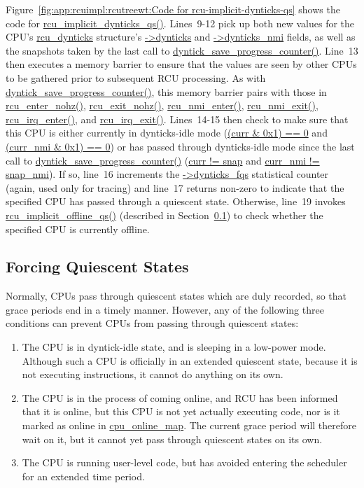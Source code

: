 Figure~\ref{fig:app:rcuimpl:rcutreewt:Code for rcu-implicit-dynticks-qs}
shows the code for \url{rcu_implicit_dynticks_qs()}.
Lines~9-12 pick up both new values for the CPU's \url{rcu_dynticks}
structure's \url{->dynticks} and \url{->dynticks_nmi} fields, as well
as the snapshots taken by the last call to
\url{dyntick_save_progress_counter()}.
Line~13 then executes a memory barrier to ensure that the values are
seen by other CPUs to be gathered prior to subsequent RCU processing.
As with \url{dyntick_save_progress_counter()}, this memory barrier
pairs with those in \url{rcu_enter_nohz()},
\url{rcu_exit_nohz()}, \url{rcu_nmi_enter()}, \url{rcu_nmi_exit()},
\url{rcu_irq_enter()}, and \url{rcu_irq_exit()}.
Lines~14-15 then check to make sure that this CPU is either currently
in dynticks-idle mode (\url{(curr & 0x1) == 0} and
\url{(curr_nmi & 0x1) == 0}) or has passed through dynticks-idle mode
since the last call to \url{dyntick_save_progress_counter()}
(\url{curr != snap} and \url{curr_nmi != snap_nmi}).
If so, line~16 increments the \url{->dynticks_fqs} statistical
counter (again, used only for tracing) and line~17 returns non-zero
to indicate that the specified CPU has passed through a quiescent state.
Otherwise, line~19 invokes \url{rcu_implicit_offline_qs()}
(described in Section~\ref{app:rcuimpl:rcutreewt:Forcing Quiescent States})
to check whether the specified CPU is currently offline.

\subsection{Forcing Quiescent States}
\label{app:rcuimpl:rcutreewt:Forcing Quiescent States}

Normally, CPUs pass through quiescent states which are duly recorded,
so that grace periods end in a timely manner.
However, any of the following three conditions can prevent CPUs from
passing through quiescent states:

\begin{enumerate}
\item	The CPU is in dyntick-idle state, and is sleeping in a low-power
	mode.
	Although such a CPU is officially in an extended quiescent state,
	because it is not executing instructions, it cannot do anything
	on its own.
\item	The CPU is in the process of coming online, and RCU has been
	informed that it is online, but this CPU is not yet actually
	executing code, nor is it marked as online in \url{cpu_online_map}.
	The current grace period will therefore wait on it, but it cannot
	yet pass through quiescent states on its own.
\item	The CPU is running user-level code, but has avoided
	entering the scheduler for an extended time period.
\end{enumerate}


